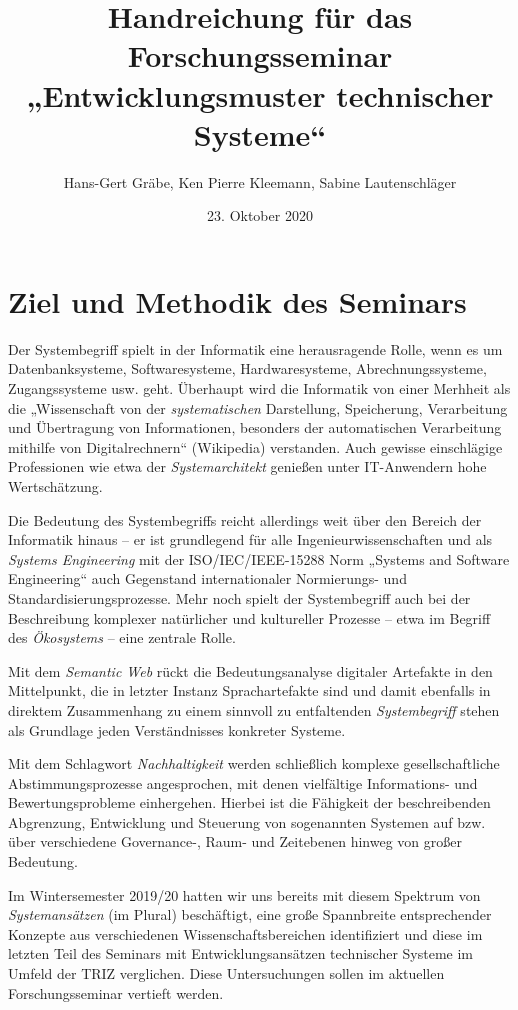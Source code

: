 \documentclass[11pt,a4paper]{article}
\title{Handreichung für das Forschungsseminar\\ „Entwicklungsmuster
  technischer Systeme“}
\author{Hans-Gert Gr\"abe, Ken Pierre Kleemann, Sabine Lautenschläger}
\date{23. Oktober 2020}
\begin{document}
\maketitle

\section{Ziel und Methodik des Seminars}

Der Systembegriff spielt in der Informatik eine herausragende Rolle, wenn es
um Datenbanksysteme, Softwaresysteme, Hardwaresysteme, Abrechnungssysteme,
Zugangssysteme usw. geht.  Überhaupt wird die Informatik von einer Merhheit
als die „Wissenschaft von der \emph{systematischen} Darstellung, Speicherung,
Verarbeitung und Übertragung von Informationen, besonders der automatischen
Verarbeitung mithilfe von Digitalrechnern“ (Wikipedia) verstanden.  Auch
gewisse einschlägige Professionen wie etwa der \emph{Systemarchitekt} genießen
unter IT-Anwendern hohe Wertschätzung.

Die Bedeutung des Systembegriffs reicht allerdings weit über den Bereich der
Informatik hinaus -- er ist grundlegend für alle Ingenieurwissenschaften und
als \emph{Systems Engineering} mit der ISO/IEC/IEEE-15288 Norm „Systems and
Software Engineering“ auch Gegenstand internationaler Normierungs- und
Standardisierungsprozesse.  Mehr noch spielt der Systembegriff auch bei der
Beschreibung komplexer natürlicher und kultureller Prozesse -- etwa im Begriff
des \emph{Ökosystems} -- eine zentrale Rolle.

Mit dem \emph{Semantic Web} rückt die Bedeutungsanalyse digitaler Artefakte in
den Mittelpunkt, die in letzter Instanz Sprachartefakte sind und damit
ebenfalls in direktem Zusammenhang zu einem sinnvoll zu entfaltenden
\emph{Systembegriff} stehen als Grundlage jeden Verständnisses konkreter
Systeme.

Mit dem Schlagwort \emph{Nachhaltigkeit} werden schließlich komplexe
gesellschaftliche Abstimmungsprozesse angesprochen, mit denen vielfältige
Informations- und Bewertungsprobleme einhergehen. Hierbei ist die Fähigkeit
der beschreibenden Abgrenzung, Entwicklung und Steuerung von sogenannten
Systemen auf bzw. über verschiedene Governance-, Raum- und Zeitebenen hinweg
von großer Bedeutung.

Im Wintersemester 2019/20 hatten wir uns bereits mit diesem Spektrum von
\emph{Systemansätzen} (im Plural) beschäftigt, eine große Spannbreite
entsprechender Konzepte aus verschiedenen Wissenschaftsbereichen identifiziert
und diese im letzten Teil des Seminars mit Entwicklungsansätzen technischer
Systeme im Umfeld der TRIZ verglichen.  Diese Untersuchungen sollen im
aktuellen Forschungsseminar vertieft werden.
\newpage
\end{document}
